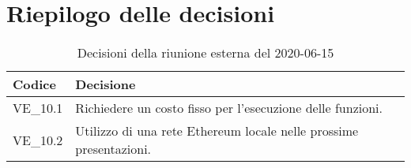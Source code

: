 \section{Riepilogo delle decisioni}
\begin{longtable}{
	 >{\centering}p{} >{}p{} }
	\caption{Decisioni della riunione esterna del 2020-06-15}\\

	\textbf{\color{white}Codice} &
	\textbf{\color{white}Decisione}
	\tabularnewline
	\endhead

	VE\_10.1 & Richiedere un costo fisso per l'esecuzione delle funzioni. \\
	VE\_10.2 & Utilizzo di una rete Ethereum locale nelle prossime presentazioni. \\
\end{longtable}
